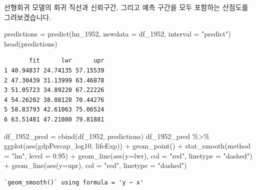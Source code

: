 \documentclass[
  letterpaper,
  DIV=11,
  numbers=noendperiod]{scrartcl}
\newenvironment{Shaded}{\begin{snugshade}}{\end{snugshade}}
\newcommand{\AttributeTok}[1]{\textcolor[rgb]{0.40,0.45,0.13}{#1}}
\newcommand{\FloatTok}[1]{\textcolor[rgb]{0.68,0.00,0.00}{#1}}
\newcommand{\FunctionTok}[1]{\textcolor[rgb]{0.28,0.35,0.67}{#1}}
\newcommand{\NormalTok}[1]{\textcolor[rgb]{0.00,0.23,0.31}{#1}}
\newcommand{\OtherTok}[1]{\textcolor[rgb]{0.00,0.23,0.31}{#1}}
\newcommand{\SpecialCharTok}[1]{\textcolor[rgb]{0.37,0.37,0.37}{#1}}
\newcommand{\StringTok}[1]{\textcolor[rgb]{0.13,0.47,0.30}{#1}}
\begin{document}
선형회귀 모델의 회귀 직선과 신뢰구간, 그리고 예측 구간을 모두 포함하는
산점도를 그려보겠습니다.

\begin{Shaded}
\begin{Highlighting}[]
\NormalTok{predictions }\OtherTok{=} \FunctionTok{predict}\NormalTok{(lm\_1952, }\AttributeTok{newdata =}\NormalTok{ df\_1952, }\AttributeTok{interval =} \StringTok{"predict"}\NormalTok{)}
\FunctionTok{head}\NormalTok{(predictions)}
\end{Highlighting}
\end{Shaded}

\begin{verbatim}
       fit      lwr      upr
1 40.94837 24.74135 57.15539
2 47.30439 31.13999 63.46878
3 51.05723 34.89220 67.22226
4 54.26202 38.08128 70.44276
5 58.83793 42.61063 75.06524
6 63.51481 47.21080 79.81881
\end{verbatim}

\begin{Shaded}
\begin{Highlighting}[]
\NormalTok{df\_1952\_pred }\OtherTok{=} \FunctionTok{cbind}\NormalTok{(df\_1952, predictions)}
\NormalTok{df\_1952\_pred }\SpecialCharTok{\%\textgreater{}\%}
  \FunctionTok{ggplot}\NormalTok{(}\FunctionTok{aes}\NormalTok{(gdpPercap\_log10, lifeExp)) }\SpecialCharTok{+} 
  \FunctionTok{geom\_point}\NormalTok{() }\SpecialCharTok{+} 
  \FunctionTok{stat\_smooth}\NormalTok{(}\AttributeTok{method =} \StringTok{"lm"}\NormalTok{, }\AttributeTok{level =} \FloatTok{0.95}\NormalTok{) }\SpecialCharTok{+} 
  \FunctionTok{geom\_line}\NormalTok{(}\FunctionTok{aes}\NormalTok{(}\AttributeTok{y=}\NormalTok{lwr), }\AttributeTok{col =} \StringTok{"red"}\NormalTok{, }\AttributeTok{linetype =} \StringTok{"dashed"}\NormalTok{) }\SpecialCharTok{+} 
  \FunctionTok{geom\_line}\NormalTok{(}\FunctionTok{aes}\NormalTok{(}\AttributeTok{y=}\NormalTok{upr), }\AttributeTok{col =} \StringTok{"red"}\NormalTok{, }\AttributeTok{linetype =} \StringTok{"dashed"}\NormalTok{)}
\end{Highlighting}
\end{Shaded}

\begin{verbatim}
`geom_smooth()` using formula = 'y ~ x'
\end{verbatim}
\end{document}
